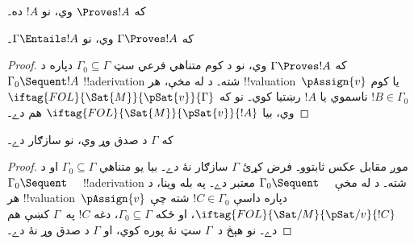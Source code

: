 \documentclass[../../../include/open-logic-section]{subfiles}
\begin{document}
\begin{cor}
که $\Proves !A$ وي، نو $!A$  ده۔
\end{cor}

\begin{cor}
که $\Gamma \Proves !A$ وي، نو $\Gamma \Entails !A$۔
\end{cor}

\begin{proof}
که $\Gamma \Proves !A$ وي، نو د کوم متناهي فرعي سټ
$\Gamma_0 \subseteq \Gamma$ دپاره د
$\Gamma_0 \Sequent !A$ !!a{derivation} شته۔ د
 له مخې، هر
{!!{valuation}~$\pAssign{v}$} يا کوم $!B \in \Gamma_0$
ناسموي يا $!A$ رښتيا کوي۔ نو که
$\iftag{FOL}{\Sat{M}}{\pSat{v}}{\Gamma}$ وي، بيا
$\iftag{FOL}{\Sat{M}}{\pSat{v}}{!A}$ هم دے۔
\end{proof}

\begin{cor}
که $\Gamma$ د صدق وړ وي، نو سازګار دے۔
\end{cor}

\begin{proof}
موږ مقابل عکس ثابتوو۔ فرض کړئ $\Gamma$ سازګار نۀ دے۔ بيا يو
متناهي $\Gamma_0 \subseteq \Gamma$ او د
$\Gamma_0 \Sequent \quad$ !!a{derivation} شته۔ د
 له مخې
$\Gamma_0 \Sequent \quad$ معتبر دے۔ په بله وينا، د هر
{!!{valuation}~$\pAssign{v}$} دپاره داسې
$!C \in \Gamma_0$ شته چې
$\iftag{FOL}{\Sat/{M}}{\pSat/{v}}{!C}$، او ځکه
$\Gamma_0 \subseteq \Gamma$، دغه $!C$ په~$\Gamma$ کښې هم دے۔
نو هېڅ  د~$\Gamma$ سټ نۀ
پوره کوي، او $\Gamma$ د صدق وړ نۀ دے۔
\end{proof}
\end{document}
